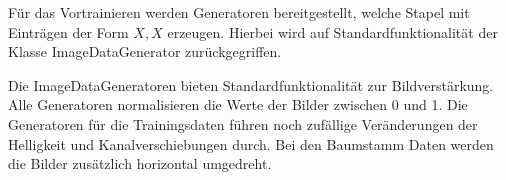 	Für das Vortrainieren werden Generatoren bereitgestellt, welche Stapel mit Einträgen der Form $X ,X$ erzeugen. Hierbei wird auf Standardfunktionalität der Klasse ImageDataGenerator zurückgegriffen.
	
	Die ImageDataGeneratoren bieten Standardfunktionalität zur Bildverstärkung. Alle Generatoren normalisieren die Werte der Bilder zwischen 0 und 1. Die Generatoren für die Trainingsdaten führen noch zufällige Veränderungen der Helligkeit und Kanalverschiebungen durch. Bei den Baumstamm Daten werden die Bilder zusätzlich horizontal umgedreht. 


 


 
